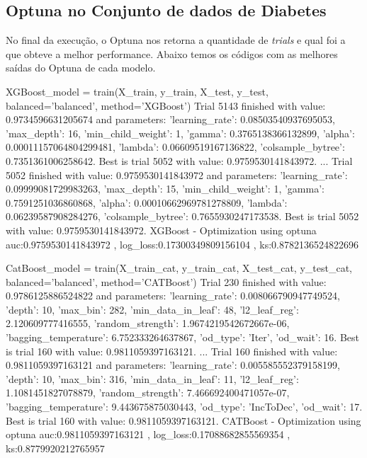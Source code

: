 \subsection{Optuna no Conjunto de dados de Diabetes}
No final da execução, o Optuna nos retorna a quantidade de \textit{trials} e qual foi a que obteve a melhor performance. Abaixo temos os códigos com as melhores saídas do Optuna de cada modelo.
\begin{codigo}[caption={Resultado do Optuna no conjunto de dados de Diabetes.}, label={codigo:res:op:dia}, language=Python, breaklines=true]
XGBoost_model = train(X_train, y_train, X_test, y_test, balanced='balanced', method='XGBoost')
Trial 5143 finished with value: 0.9734596631205674 and parameters: {'learning_rate': 0.08503540937695053, 'max_depth': 16, 'min_child_weight': 1, 'gamma': 0.3765138366132899, 'alpha': 0.00011157064804299481, 'lambda': 0.06609519167136822, 'colsample_bytree': 0.7351361006258642}. Best is trial 5052 with value: 0.9759530141843972.
...
Trial 5052 finished with value: 0.9759530141843972 and parameters: {'learning_rate': 0.09999081729983263, 'max_depth': 15, 'min_child_weight': 1, 'gamma': 0.7591251036860868, 'alpha': 0.00010662969781278809, 'lambda': 0.06239587908284276, 'colsample_bytree': 0.7655930247173538}. Best is trial 5052 with value: 0.9759530141843972.
XGBoost - Optimization using optuna
auc:0.9759530141843972 , log_loss:0.17300349809156104 , ks:0.8782136524822696

CatBoost_model = train(X_train_cat, y_train_cat, X_test_cat, y_test_cat, balanced='balanced', method='CATBoost')
Trial 230 finished with value: 0.9786125886524822 and parameters: {'learning_rate': 0.008066790947749524, 'depth': 10, 'max_bin': 282, 'min_data_in_leaf': 48, 'l2_leaf_reg': 2.120609777416555, 'random_strength': 1.9674219542672667e-06, 'bagging_temperature': 6.752333264637867, 'od_type': 'Iter', 'od_wait': 16}. Best is trial 160 with value: 0.9811059397163121.
...
Trial 160 finished with value: 0.9811059397163121 and parameters: {'learning_rate': 0.005585552379158199, 'depth': 10, 'max_bin': 316, 'min_data_in_leaf': 11, 'l2_leaf_reg': 1.1081451827078879, 'random_strength': 7.466692400471057e-07, 'bagging_temperature': 9.443675875030443, 'od_type': 'IncToDec', 'od_wait': 17}. Best is trial 160 with value: 0.9811059397163121.
CATBoost - Optimization using optuna
auc:0.9811059397163121 , log_loss:0.17088682855569354 , ks:0.8779920212765957


\end{codigo}
